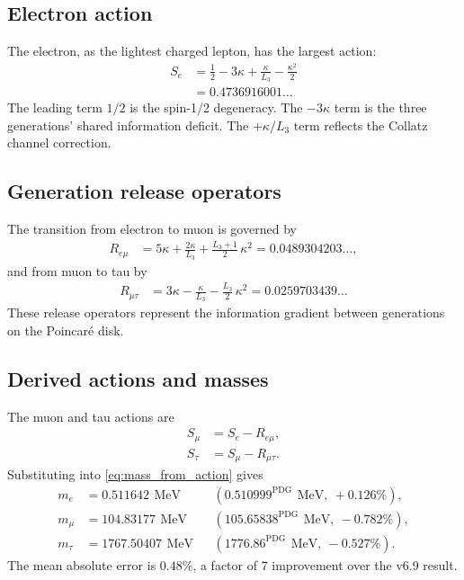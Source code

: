 \documentclass[aps,prd,reprint,twocolumn,showpacs,superscriptaddress]{revtex4-2}
\newcommand{\mev}{\,\text{MeV}}
\newcommand{\PDG}[1]{\ensuremath{#1^{\text{PDG}}}}
\begin{document}
\subsection{Electron action}

The electron, as the lightest charged lepton, has the largest action:
\begin{align}
S_e &= \frac12 - 3\kappa + \frac{\kappa}{L_3} - \frac{\kappa^2}{2} \\
    &= 0.4736916001 \ldots
\label{eq:S_e}
\end{align}
The leading term $1/2$ is the spin-1/2 degeneracy.  The $-3\kappa$ term
is the three generations' shared information deficit.  The
$+\kappa/L_3$ term reflects the Collatz channel correction.

\subsection{Generation release operators}

The transition from electron to muon is governed by
\begin{align}
R_{e\mu} &= 5\kappa + \frac{2\kappa}{L_3} +
\frac{L_3 + 1}{2}\,\kappa^2 = 0.0489304203\ldots,
\label{eq:R_em}
\end{align}
and from muon to tau by
\begin{align}
R_{\mu\tau} &= 3\kappa - \frac{\kappa}{L_3} -
\frac{L_3}{2}\,\kappa^2 = 0.0259703439\ldots
\label{eq:R_mt}
\end{align}
These release operators represent the information gradient between
generations on the Poincar\'{e} disk.

\subsection{Derived actions and masses}

The muon and tau actions are
\begin{align}
S_\mu &= S_e - R_{e\mu}, \\
S_\tau &= S_\mu - R_{\mu\tau}.
\end{align}
Substituting into \eqref{eq:mass_from_action} gives
\begin{align}
m_e &= 0.511642\ \mev &&(\PDG{0.510999}\ \mev,\ +0.126\%), \\
m_\mu &= 104.83177\ \mev &&(\PDG{105.65838}\ \mev,\ -0.782\%), \\
m_\tau &= 1767.50407\ \mev &&(\PDG{1776.86}\ \mev,\ -0.527\%).
\end{align}
The mean absolute error is $0.48\%$, a factor of 7 improvement over the
v6.9 result.
\end{document}
